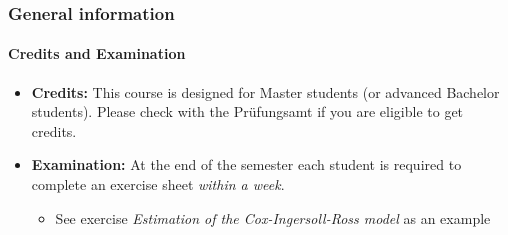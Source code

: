 \documentclass[notes=show]{beamer}
\begin{document}
\begin{frame}\frametitle{General information}\framesubtitle{Credits and Examination}
    \begin{itemize}
      \item \textbf{Credits:} This course is designed for Master students (or advanced Bachelor students). Please check with the Pr\"ufungsamt if you are eligible to get credits.
      \item \textbf{Examination:} At the end of the semester each student is required to complete an exercise sheet \emph{within a week}. 
      \begin{itemize}
      \item See exercise \emph{Estimation of the Cox-Ingersoll-Ross model} as an example
      \end{itemize}
    \end{itemize}
\end{frame}
\end{document}
